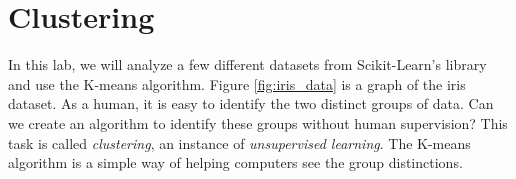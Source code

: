 \section*{Clustering}

In this lab, we will analyze a few different datasets from Scikit-Learn's library and use the K-means algorithm. 
Figure \ref{fig:iris_data} is a graph of the iris dataset.
As a human, it is easy to identify the two distinct groups of data.
Can we create an algorithm to identify these groups without human supervision?
This task is called \emph{clustering}, an instance of \emph{unsupervised learning}.
The K-means algorithm is a simple way of helping computers see the group distinctions.

